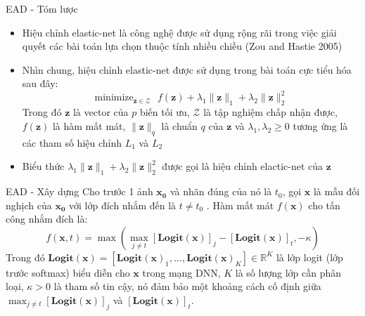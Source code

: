 \begin{frame}{EAD - Tóm lược}
    \begin{itemize}
        \item Hiệu chỉnh elastic-net là công nghệ được sử dụng rộng rãi trong việc giải quyết 
        các bài toán lựa chọn thuộc tính nhiều chiều (Zou and Hastie 2005)

        \item Nhìn chung, hiệu chỉnh elastic-net được sử dụng trong bài toán cực 
        tiểu hóa sau đây:
        \begin{equation}
            \label{eq:3.1}
            \text{minimize}_{\mathbf{z} \in \mathcal{Z}} \text{ }
            f(\mathbf{z}) + \lambda_1 \lVert \mathbf{z} \rVert_1
            + \lambda_2 \lVert \mathbf{z} \rVert_2^2
        \end{equation}
        Trong đó $\mathbf{z}$ là vector của $p$ biến tối ưu, $\mathcal{Z}$ là tập nghiệm 
        chấp nhận được, $f(\mathbf{z})$ là hàm mất mát, $\lVert \mathbf{z} \rVert_q$ là 
        chuẩn $q$ của $\mathbf{z}$ và $\lambda_1, \lambda_2 \geq 0$ tương ứng là các tham số hiệu 
        chỉnh $L_1$ và $L_2$

        \item Biểu thức $\lambda_1 \lVert \mathbf{z} \rVert_1 + \lambda_2 
        \lVert \mathbf{z} \rVert_2^2$ được gọi là hiệu chỉnh elactic-net của $\mathbf{z}$
    \end{itemize}
\end{frame}

\begin{frame}{EAD - Xây dựng}
    Cho trước 1 ảnh $\mathbf{x_0}$ và nhãn đúng của nó là $t_0$, 
    gọi $\mathbf{x}$ là mẫu đối nghịch của $\mathbf{x_0}$ với lớp đích nhắm đến là $t \neq t_0$ . Hàm mất mát 
    $f(\mathbf{x})$ cho tấn công nhắm đích là:
    \begin{equation}
        \label{eq:3.2}
        f(\mathbf{x}, t) = \max { \left( \max_{j \neq t} [\textbf{Logit}(\mathbf{x})]_j - 
        [\textbf{Logit}(\mathbf{x})]_t, -\kappa \right) }
    \end{equation}
    Trong đó $\textbf{Logit}(\mathbf{x}) = [\textbf{Logit}(\mathbf{x})_1, ..., 
    \textbf{Logit}(\mathbf{x})_K] 
    \in \mathbb{R}^K$ là lớp logit (lớp trước softmax) biểu diễn cho $\mathbf{x}$ trong mạng DNN, $K$
    là số lượng lớp cần phân loại, $\kappa > 0$ là tham số tin cậy, nó đảm bảo một khoảng 
    cách cố định giữa $\max_{j \neq t} [\textbf{Logit}(\mathbf{x})]_j$ và $[\textbf{Logit}(\mathbf{x})]_t$.
\end{frame}

